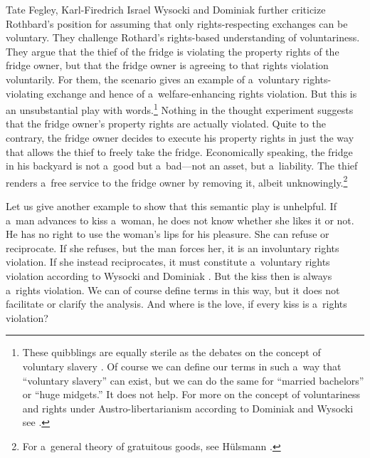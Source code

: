 \begin{artengenv2auth}{Tate Fegley, Karl-Firedrich Israel}
Wysocki and Dominiak 
\parencite*[][pp.63–64]{wysocki_how_2023} %
 further criticize Rothbard's position for assuming that only rights-respecting exchanges can be voluntary. They challenge Rothard's rights-based understanding of voluntariness. They argue that the thief of the fridge is violating the property rights of the fridge owner, but that the fridge owner is agreeing to that rights violation voluntarily. For them, the scenario gives an example of a~voluntary rights-violating exchange and hence of a~welfare-enhancing rights violation. But this is an unsubstantial play with words.\footnote{These quibblings are equally sterile as the debates on the concept of voluntary slavery 
\parencites[][]{block_toward_2003}[][]{casey_can_2011}[][]{dominiak_problem_2017}. %
 Of course we can define our terms in such a~way that ``voluntary slavery'' can exist, but we can do the same for ``married bachelors'' or ``huge midgets.'' It does not help. For more on the concept of voluntariness and rights under Austro-libertarianism according to Dominiak and Wysocki see 
\parencites[][]{dominiak_libertarianism_2018}[][]{dominiak_contract_2022}[][]{dominiak_proceeds_2023}[][]{dominiak_contract_2022}[][]{megger_coercion_2023}[][]{wysocki_problems_2020}[][]{wysocki_austro-libertarian_2021}[][]{wysocki_austrian_2019}[][]{wysocki_austrian_2019}[][]{wysocki_problems_2020}.%
} Nothing in the thought experiment suggests that the fridge owner's property rights are actually violated. Quite to the contrary, the fridge owner decides to execute his property rights in just the way that allows the thief to freely take the fridge. Economically speaking, the fridge in his backyard is not a~good but a~bad---not an asset, but a~liability. The thief renders a~free service to the fridge owner by removing it, albeit unknowingly.\footnote{For a~general theory of gratuitous goods, see Hülsmann 
\parencite*[][]{hulsmann_wirtschaft_2023}.%
}



Let us give another example to show that this semantic play is unhelpful. If a~man advances to kiss a~woman, he does not know whether she likes it or not. He has no right to use the woman's lips for his pleasure. She can refuse or reciprocate. If she refuses, but the man forces her, it is an involuntary rights violation. If she instead reciprocates, it must constitute a~voluntary rights violation according to Wysocki and Dominiak 
\parencite*[][]{wysocki_how_2023}. %
 But the kiss then is always a~rights violation. We can of course define terms in this way, but it does not facilitate or clarify the analysis. And where is the love, if every kiss is a~rights violation?




\end{artengenv2auth}
